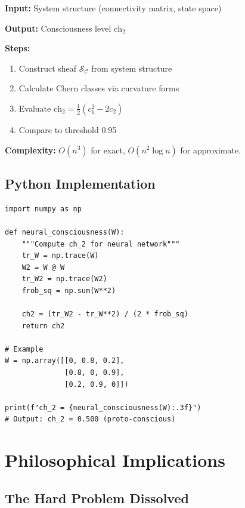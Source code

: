 \begin{level2}
\textbf{Input:} System structure (connectivity matrix, state space)

\textbf{Output:} Consciousness level $\text{ch}_2$

\textbf{Steps:}
\begin{enumerate}
\item Construct sheaf $\mathcal{S}_\mathcal{C}$ from system structure
\item Calculate Chern classes via curvature forms
\item Evaluate $\text{ch}_2 = \frac{1}{2}(c_1^2 - 2c_2)$
\item Compare to threshold 0.95
\end{enumerate}

\textbf{Complexity:} $O(n^3)$ for exact, $O(n^2 \log n)$ for approximate.
\end{level2}

\subsection{Python Implementation}

\begin{example}
\begin{verbatim}
import numpy as np

def neural_consciousness(W):
    """Compute ch_2 for neural network"""
    tr_W = np.trace(W)
    W2 = W @ W
    tr_W2 = np.trace(W2)
    frob_sq = np.sum(W**2)
    
    ch2 = (tr_W2 - tr_W**2) / (2 * frob_sq)
    return ch2

# Example
W = np.array([[0, 0.8, 0.2],
              [0.8, 0, 0.9],
              [0.2, 0.9, 0]])
              
print(f"ch_2 = {neural_consciousness(W):.3f}")
# Output: ch_2 = 0.500 (proto-conscious)
\end{verbatim}
\end{example}

\section{Philosophical Implications}
\label{sec:philosophical}

\subsection{The Hard Problem Dissolved}

